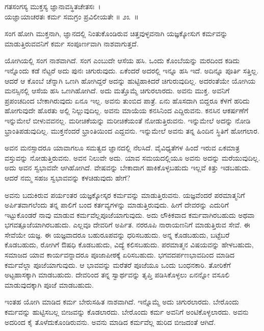 \begin{shloka}
ಗತಸಂಗಸ್ಯ ಮುಕ್ತಸ್ಯ ಜ್ಞಾನಾವಸ್ಥಿತಚೇತಸಃ~।\\ಯಜ್ಞಾಯಾಚರತಃ ಕರ್ಮ ಸಮಗ್ರಂ ಪ್ರವಿಲೀಯತೇ \hfill॥ ೨೩~॥
\end{shloka}

\begin{artha}
ಸಂಗ ಹೋಗಿ ಮುಕ್ತನಾಗಿ, ಜ್ಞಾನದಲ್ಲಿ ನಿಂತುಕೊಂಡಿರುವ ಚಿತ್ತವುಳ್ಳವನಾಗಿ ಯಜ್ಞಕ್ಕೋಸುಗ ಕರ್ಮವನ್ನು ಮಾಡುತ್ತಿರುವವನಿಗೆ ಕರ್ಮ ಸಂಪೂರ್ಣವಾಗಿ ನಾಶವಾಗುತ್ತದೆ.
\end{artha}

ಯೋಗಿಯಲ್ಲಿ ಸಂಗ ನಾಶವಾಗಿದೆ. ಸಂಗ ಎಂಬುದೇ ಆಸೆಯ ಹಸಿ. ಒಂದು ಕೊಂಬೆಯನ್ನು ಮರದಿಂದ ಕಡಿದು ಇನ್ನೊಂದು ಕಡೆ ನೆಟ್ಟರೆ ಅದು ಪುನಃ ಚಿಗುರುವುದು. ಏಕೆಂದರೆ ಅದರಲ್ಲಿ ಇನ್ನೂ ಹಸಿ ಇದೆ. ಅದಿನ್ನೂ ಪೂರ್ತಿ ಸತ್ತಿಲ್ಲ. ಆದರೆ ಆ ಕೊಂಬೆ ಚೆನ್ನಾಗಿ ಒಣಗಿ ಹೋಗಿದ್ದರೆ ಅದನ್ನು ಹುಟ್ಟಿಹಾಕಿದರೆ ಚಿಗುರುವುದಿಲ್ಲ. ಅದರಂತೆಯೇ ಯೋಗಿಯ ಮನಸ್ಸಿನಲ್ಲಿ ಆಸೆಯ ಹಸಿ ಒಣಗಿಹೋಗಿದೆ. ಅದು ಮತ್ತೊಮ್ಮೆ ಚಿಗುರಲಾರದು. ಅವನು ಮುಕ್ತ. ಅವನಿಗೆ ಪ್ರಪಂಚದಿಂದ ಬೇಕಾಗಿರುವುದು ಏನೂ ಇಲ್ಲ. ಅವನು ತುಂಬಿದ ಪಾತ್ರೆ. ಏನು ಹೊಸದಾಗಿ ಬಿದ್ದರೂ ಕೆಳಗೆ ಹರಿದು ಹೋಗುವುದೇ ಹೊರತು ಅಲ್ಲಿ ನಿಲ್ಲುವುದಿಲ್ಲ. ಅವನು ಮಾಯೆಯ ಕನಸಿನಿಂದ ಎದ್ದಿರುವನು. ಕನಸಿನ ಆಕರ್ಷಣೆಗೆ ಇನ್ನುಮೇಲೆ ಬೀಳುವವನಲ್ಲ. ಮರೀಚಿಕೆಯನ್ನು ಮರೀಚಿಕೆಯಂತೆ ನೋಡುತ್ತಿರುವನು. ಇನ್ನುಮೇಲೆ ಅದನ್ನು ನೋಡಿ ಭ್ರಾಂತಿಪಡುವುದಿಲ್ಲ. ಮುಕ್ತನೆಂದರೆ ಭ್ರಾಂತಿಯಿಂದ ಎದ್ದವನು. ಇನ್ನುಮೇಲೆ ಅವನು ತನ್ನ ಹಿಂದಿನ ಸ್ಥಿತಿಗೆ ಹೋಗಲಾರ.

ಅವನ ಮನಸ್ಸಾದರೂ ಯಾವಾಗಲೂ ಸಮತ್ವದ ಜ್ಞಾನದಲ್ಲಿ ನೆಲಸಿದೆ. ವೈವಿಧ್ಯತೆಗಳ ಹಿಂದೆ ಇರುವ ಏಕಮಾತ್ರ ವಸ್ತುವನ್ನು ನೋಡುತ್ತಿರುವನು. ಅವನ ನಿಲುವೇ ಅದು. ಯಾವ ಸಮಯದಲ್ಲಿಯೂ ಅವನು ಅದನ್ನು ಮರೆಯುವುದಿಲ್ಲ. ಅದು ಅವನ ಸ್ವಭಾವವೇ ಆಗಿಹೋಗಿದೆ. ವೇಷವನ್ನು ಬೇಕಾದಾಗ ಹಾಕಿಕೊಳ್ಳಬಹುದು ಇಲ್ಲವೆ ಕಿತ್ತು ಇಡಬಹುದು. ಆದರೆ ನಮ್ಮ ಸಹಜ ಸ್ವಭಾವವನ್ನು ಕಳಚಿಡುವುದು ಹೇಗೆ?

ಅವನು ಬದುಕಿರುವ ಪರ್ಯಂತರ ಯಜ್ಞಕ್ಕೋಸ್ಕರ ಕರ್ಮವನ್ನು ಮಾಡುತ್ತಿರುವನು. ಯಜ್ಞವೆಂದರೆ ಪರಮಾತ್ಮನಿಗೆ ಅರ್ಪಿತವಾಗಲೆಂದು ತನ್ನ ಪಾಲಿಗೆ ಬಂದ ಕರ್ತವ್ಯಗಳನ್ನು ಮಾಡು\-ತ್ತಿರುವುದು. ಹೀಗೆ ದೇವರನ್ನು ಎದುರಿಗೆ ಇಟ್ಟುಕೊಂಡರೆ ನಾವು ಮಾಡುವ ಕರ್ಮವೆಲ್ಲ\break ಪೂಜೆಯಾಗುವುದು. ಅದು ಲೌಕಿಕವಾದ ಕರ್ಮವಾಗಿರಬಹುದು ಅಥವಾ ಭಗವತ್ಪೂಜೆಯಾಗಿರಬಹುದು. ಎಲ್ಲವೂ ದೇವರಿಗೆ ಅರ್ಪಿತ. ನರರೂಪಿ ನಾರಾಯಣನಿಗೆ ಮಾಡುತ್ತಿರುವ ಸೇವೆ. ಈ ಸೇವೆಯೇ ಯಜ್ಞ. ಈ ಯಜ್ಞವಾದರೂ ಬಹುರೂಪವನ್ನು ಧರಿಸಬಹುದು. ಅನ್ನ ಕೊಡಬಹುದು, ಬಟ್ಟೆಬರೆ ಕೊಡಬಹುದು, ರೋಗಿಗೆ ಔಷಧಿ ಕೊಡಬಹುದು, ವಿದ್ಯೆ ಕಲಿಸಬಹುದು. ಪರಮಾತ್ಮನ ವಿಷಯವನ್ನು ಹೇಳಬಹುದು, ಸಮಾಜದ ಯಾವ ಕಾರ್ಯವನ್ನಾದರೂ ಪೂಜಾಪೀಠಕ್ಕೆ ಏರಿಸಬಹುದು. ಭಗವದರ್ಪಣಭಾವದಿಂದ ಮಾಡಿದ ಕರ್ಮವೆಲ್ಲಾ ಪೂಜೆಯಾಗುವುದು. ಆ ಭಾವವನ್ನು ಮರೆತರೆ ಪೂಜೆಯೂ ಒಂದು ಬಂಧನಕಾರಿ. ತೋರಿಕೆಗೆ ಅಟ್ಟಹಾಸಕ್ಕಾಗಿ ಮಾಡಬಹುದು. ದೇವರಿಂದ ತನ್ನ ಸ್ವಾರ್ಥವನ್ನು ತೃಪ್ತಿ ಪಡಿಸಿಕೊಳ್ಳಲು ಏನನ್ನೋ ವಸೂಲಿ ಮಾಡುವುದಕ್ಕಾಗಿ ಪೂಜೆ ಮಾಡಬಹುದು.

ಇಂತಹ ಯೋಗಿ ಮಾಡಿದ ಕರ್ಮ ಬೇರುಸಹಿತ ನಾಶವಾಗಿದೆ. ಇನ್ನೊಮ್ಮೆ ಅದು ಚಿಗುರಲಾರದು. ಬೇರೊಂದು ಕರ್ಮವನ್ನು ಹುಟ್ಟಿಸಬಲ್ಲ ಬೀಜವನ್ನು ಕೊಡಲಾರದು. ಬೇರೊಂದು ಕರ್ಮ ಅವನಿಗೆ ಅಂಟಿಕೊಳ್ಳಲಾರದು. ಅವನು ಅದರಿಂದ ಕೈ ತೊಳೆದುಕೊಂಡಿರುವನು. ಅವನು ಮಾಡಿದ ಕರ್ಮವೆಲ್ಲ ಹುರಿದ ಬೀಜದಂತೆ ಆಗಿದೆ.

